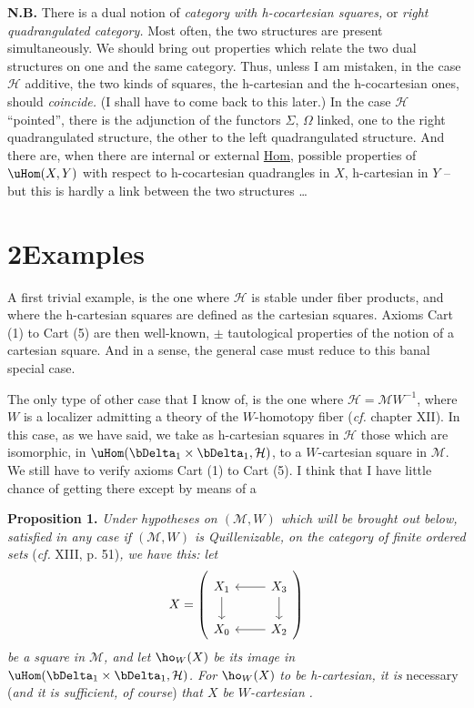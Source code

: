 
\textbf{N.B.} There is a dual notion of \textit{category with h-cocartesian squares,} or \textit{right quadrangulated category.} Most often, the two structures are present simultaneously. We should bring out properties which relate the two dual structures on one and the same category. Thus, unless I am mistaken, in the case $\mathcal{H}$ additive, the two kinds of squares, the h-cartesian and the h-cocartesian ones, should \textit{coincide.} (I shall have to come back to this later.) In the case $\mathcal{H}$ ``pointed'', there is the adjunction of the functors $\Sigma$, $\Omega$ linked, one to the right quadrangulated structure, the other to the left quadrangulated structure. And there are, when there are internal or external \underline{Hom}, possible properties of $\uHom(X,Y)$ with respect to h-cocartesian quadrangles in $X$, h-cartesian in $Y$ -- but this is hardly a link between the two structures \ldots

\section*{2\quad Examples}

A first trivial example, is the one where $\mathcal{H}$ is stable under fiber products, and where the h-cartesian squares are defined as the cartesian squares. Axioms Cart (1) to Cart (5) are then well-known, $\pm$ tautological properties of the notion of a cartesian square. And
in a sense, the general case must reduce to this banal special case.

The only type of other case that I know of, is the one where $\mathcal{H} = \mathcal{M}W^{-1}$, where $W$ is a localizer admitting a theory of the $W$-homotopy fiber (\textit{cf.} chapter XII). In this case, as we have said, we take as h-cartesian squares in $\mathcal{H}$ those which are isomorphic, in $\uHom(\bDelta_1 \times \bDelta_1, \mathcal{H})$, to a $W$-cartesian square in $\mathcal{M}$. We still have to verify axioms Cart (1) to Cart (5). I think that I have little chance of getting there except by means of a

\textbf{Proposition 1.} \textit{Under hypotheses on $(\mathcal{M}, W)$ which will be brought out below, satisfied in any case if $(\mathcal{M}, W)$ is Quillenizable, on the category of finite ordered sets} (\textit{cf.} XIII, p. 51)\textit{, we have this: let}
\[
X = \left(\begin{tikzcd}
X_1 \ar[d] & X_3 \ar[l] \ar[d] \\
X_0 & X_2 \ar[l]
\end{tikzcd}\right)
\]
\textit{be a square in $\mathcal{M}$, and let} $\ho_W(X)$ \textit{be its image in} $\uHom(\bDelta_1 \times \bDelta_1, \mathcal{H})$\textit{. For} $\ho_W(X)$ \textit{to be h-cartesian, it is} necessary (\textit{and it is sufficient, of course}) \textit{that $X$ be $W$-cartesian} \textit{.}



